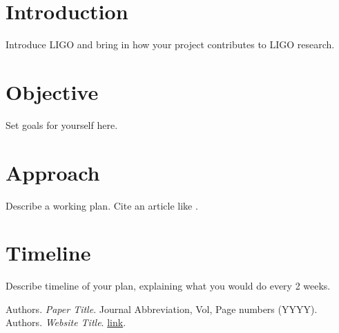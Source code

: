 \documentclass[colorlinks=true,pdfstartview=FitV,linkcolor=blue,
citecolor=red,urlcolor=magenta]{ligodoc}
\title{}
\author{}
\begin{document}
\tableofcontents

\newpage
\section{Introduction}
Introduce LIGO and bring in how your project contributes to LIGO research.

\section{Objective}
Set goals for yourself here.

\section{Approach}
Describe a working plan. Cite an article like \cite{PDH}.

\section{Timeline}
Describe timeline of your plan, explaining what you would do every 2 weeks.

\begin{thebibliography}{9}
 Authors. \emph{Paper Title}. Journal Abbreviation, Vol, Page numbers (YYYY).
 Authors. \emph{Website Title}. \url{link}.

\end{thebibliography}
\end{document}
